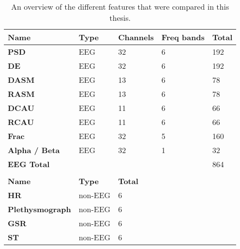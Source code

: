 \documentclass[12pt,journal,compsoc]{IEEEtran}
\begin{document}
\begin{table}[H]
\centering
\caption{An overview of the different features that were compared in this thesis.\label{featOverviewTable}}
\begin{tabular}{l|llll}
\textbf{Name}           & \textbf{Type} & \textbf{Channels}   & \textbf{Freq bands} & \textbf{Total} \\ \hline
\textbf{PSD}            & EEG           & 32                            & 6                         & 192          \\
\textbf{DE}             & EEG           & 32                            & 6                         & 192          \\
\textbf{DASM}           & EEG           & 13                            & 6                         & 78           \\
\textbf{RASM}           & EEG           & 13                            & 6                         & 78           \\
\textbf{DCAU}           & EEG           & 11                            & 6                         & 66           \\
\textbf{RCAU}           & EEG  			& 11                            & 6                         & 66           \\
\textbf{Frac}           & EEG           & 32                            & 5                         & 160          \\
\textbf{Alpha / Beta}   & EEG           & 32                            & 1                         & 32           \\
\textbf{EEG Total}      &               &                               &                           & 864          \\ \hline
                        &               &                               &                           &              \\
\textbf{Name}           & \textbf{Type} & \textbf{Total} 			&                          &              \\ \hline
\textbf{HR}             & non-EEG       & 6                             &                           &              \\
\textbf{Plethysmograph} & non-EEG       & 6                             &                           &              \\
\textbf{GSR}            & non-EEG       & 6                             &                           &              \\
\textbf{ST}             & non-EEG       & 6                             &                           &              \\

\end{tabular}
\end{table}
\end{document}
